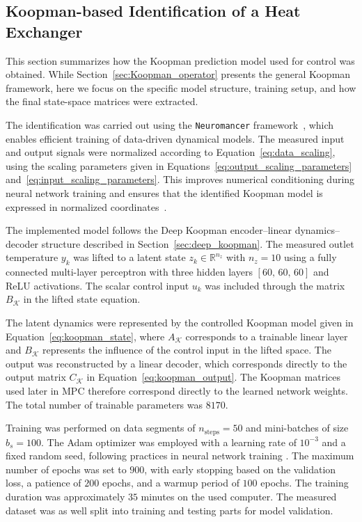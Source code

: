 \subsection{Koopman-based Identification of a Heat Exchanger}
\label{sec:koopman_identification}

This section summarizes how the Koopman prediction model used for control was obtained. While Section~\ref{sec:Koopman_operator} presents the general Koopman framework, here we focus on the specific model structure, training setup, and how the final state-space matrices were extracted.

The identification was carried out using the \texttt{Neuromancer} framework~\cite{neuromancer2022}, which enables efficient training of data-driven dynamical models. The measured input and output signals were normalized according to Equation~\eqref{eq:data_scaling}, using the scaling parameters given in Equations~\eqref{eq:output_scaling_parameters} and~\eqref{eq:input_scaling_parameters}. This improves numerical conditioning during neural network training and ensures that the identified Koopman model is expressed in normalized coordinates~\cite{sola1997importance}.



The implemented model follows the Deep Koopman encoder--linear dynamics--decoder structure described in Section~\ref{sec:deep_koopman}. The measured outlet temperature $y_k$ was lifted to a latent state $z_k \in \mathbb{R}^{n_z}$ with $n_z = 10$ using a fully connected multi-layer perceptron with three hidden layers $[60,\,60,\,60]$ and ReLU activations. The scalar control input $u_k$ was included through the matrix $B_{\mathcal K}$ in the lifted state equation.

The latent dynamics were represented by the controlled Koopman model given in Equation~\eqref{eq:koopman_state}, where $A_{\mathcal K}$ corresponds to a trainable linear layer and $B_{\mathcal K}$ represents the influence of the control input in the lifted space. The output was reconstructed by a linear decoder, which corresponds directly to the output matrix $C_{\mathcal K}$ in Equation~\eqref{eq:koopman_output}. The Koopman matrices used later in MPC therefore correspond directly to the learned network weights. The total number of trainable parameters was $8170$.

Training was performed on data segments of $n_{\mathrm{steps}} = 50$ and mini-batches of size $b_s = 100$. The Adam optimizer was employed with a learning rate of $10^{-3}$ and a fixed random seed, following practices in neural network training \cite{kingma2015adam}. The maximum number of epochs was set to $900$, with early stopping based on the validation loss, a patience of $200$ epochs, and a warmup period of $100$ epochs. The training duration was approximately $35$ minutes on the used computer. The measured dataset was as well split into training and testing parts for model validation. 


